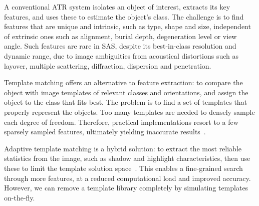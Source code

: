  

A conventional ATR system isolates an object of interest, extracts its key features, and uses these to estimate the object's class. The challenge is to find features that are unique and intrinsic, such as type, shape and size, independent of extrinsic ones such as alignment, burial depth, degeneration level or view angle. Such features are rare in SAS, despite its best-in-class resolution and dynamic range, due to image ambiguities from acoustical distortions such as layover, multiple scattering, diffraction, dispersion and penetration.


Template matching offers an alternative to feature extraction: to compare the object with image templates of relevant classes and orientations, and assign the object to the class that fits best. The problem is to find a set of templates that properly represent the objects. Too many templates are needed to densely sample each degree of freedom. Therefore, practical implementations resort to a few sparsely sampled features, ultimately yielding inaccurate results~\cite{Midelfart2010}.


Adaptive template matching is a hybrid solution: to extract the most reliable statistics from the image, such as shadow and highlight characteristics, then use these to limit the template solution space~\cite{Midelfart2010}. This enables a fine-grained search through more features, at a reduced computational load and improved accuracy. However, we can remove a template library completely by simulating templates on-the-fly.



